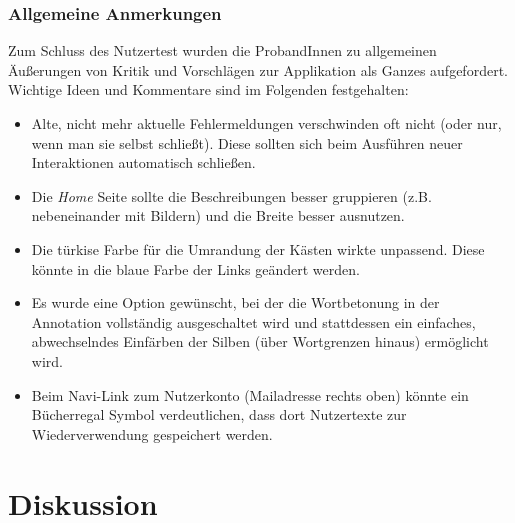 \subsubsection{Allgemeine Anmerkungen}

Zum Schluss des Nutzertest wurden die ProbandInnen zu allgemeinen Äußerungen von Kritik und Vorschlägen zur Applikation als Ganzes aufgefordert. Wichtige Ideen und Kommentare sind im Folgenden festgehalten:

\begin{itemize}
	\item Alte, nicht mehr aktuelle Fehlermeldungen verschwinden oft nicht (oder nur, wenn man sie selbst schließt). Diese sollten sich beim Ausführen neuer Interaktionen automatisch schließen.
	\item Die \textit{Home} Seite sollte die Beschreibungen besser gruppieren (z.B. nebeneinander mit Bildern) und die Breite besser ausnutzen.
	\item Die türkise Farbe für die Umrandung der Kästen wirkte unpassend. Diese könnte in die blaue Farbe der Links geändert werden.
	\item Es wurde eine Option gewünscht, bei der die Wortbetonung in der Annotation vollständig ausgeschaltet wird und stattdessen ein einfaches, abwechselndes Einfärben der Silben (über Wortgrenzen hinaus) ermöglicht wird.
	\item Beim Navi-Link zum Nutzerkonto (Mailadresse rechts oben) könnte ein Bücherregal Symbol verdeutlichen, dass dort Nutzertexte zur Wiederverwendung gespeichert werden.
\end{itemize}

\newpage
\section{Diskussion}

